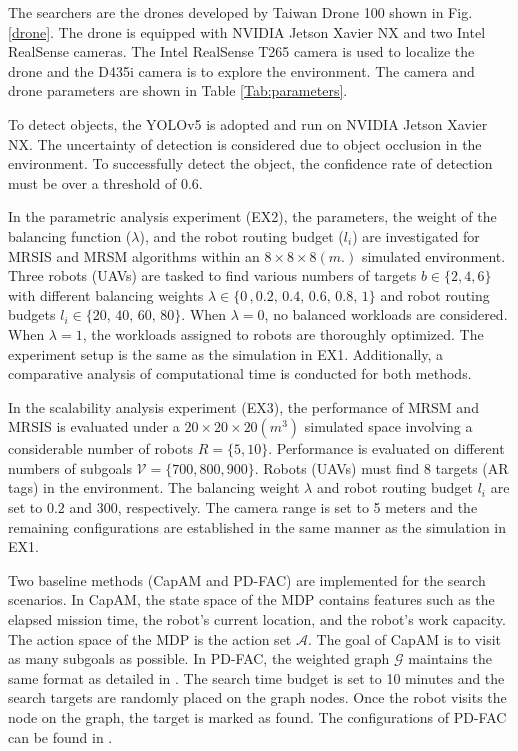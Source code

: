 The searchers are the drones developed by Taiwan Drone 100 shown in Fig. \ref{drone}.
The drone is equipped with NVIDIA Jetson Xavier NX and two Intel RealSense cameras.
The Intel RealSense T265 camera is used to localize the drone and the D435i camera is to explore the environment.
The camera and drone parameters are shown in Table \ref{Tab:parameters}.

To detect objects, the YOLOv5 \cite{glenn_jocher_2022_7347926} is adopted and run on NVIDIA Jetson Xavier NX.
The uncertainty of detection is considered due to object occlusion in the environment. To successfully detect the object, the confidence rate of detection must be over a threshold of 0.6.

In the parametric analysis experiment (EX2), the parameters, the weight of the balancing function ($\lambda$), and the robot routing budget ($l_i$) are investigated for MRSIS \cite{li2024mrsis} and MRSM algorithms within an $8\times8\times8 (m.)$ simulated environment.
Three robots (UAVs) are tasked to find various numbers of targets $b \in \{2,4,6\}$ with different balancing weights $\lambda\in\{0\,,0.2,\,0.4,\,0.6,\,0.8,\,1\}$ and robot routing budgets $l_i\in\{20,\, 40,\, 60,\, 80\}$.
When $\lambda=0$, no balanced workloads are considered.
When $\lambda=1$, the workloads assigned to robots are thoroughly optimized.
The experiment setup is the same as the simulation in EX1.
Additionally, a comparative analysis of computational time is conducted for both methods.

In the scalability analysis experiment (EX3), the performance of MRSM and MRSIS\cite{li2024mrsis} is evaluated under a
$20\times20\times20(m^3)$ simulated space involving a considerable number of robots $R=\{5, 10\}$.
Performance is evaluated on different numbers of subgoals $\mathcal{V}=\{700,800,900\}$.
Robots (UAVs) must find 8 targets (AR tags) in the environment.
The balancing weight $\lambda$ and robot routing budget $l_i$ are set to $0.2$ and $300$, respectively.
The camera range is set to 5 meters and the remaining configurations are established in the same manner as the simulation in EX1.

Two baseline methods (CapAM\cite{paull2022learning} and PD-FAC\cite{sheng2022pd}) are implemented for the search scenarios. In CapAM\cite{paull2022learning}, the state space of the MDP contains features such as the elapsed mission time, the robot's current location, and the robot's work capacity. The action space of the MDP is the action set $\mathcal{A}$. The goal of CapAM\cite{paull2022learning} is to visit as many subgoals as possible.
In PD-FAC\cite{sheng2022pd}, the weighted graph $\mathcal{G}$ maintains the same format as detailed in \cite{sheng2022pd}. The search time budget is set to 10 minutes and the search targets are randomly placed on the graph nodes. Once the robot visits the node on the graph, the target is marked as found. The configurations of PD-FAC can be found in \cite{sheng2022pd}.

